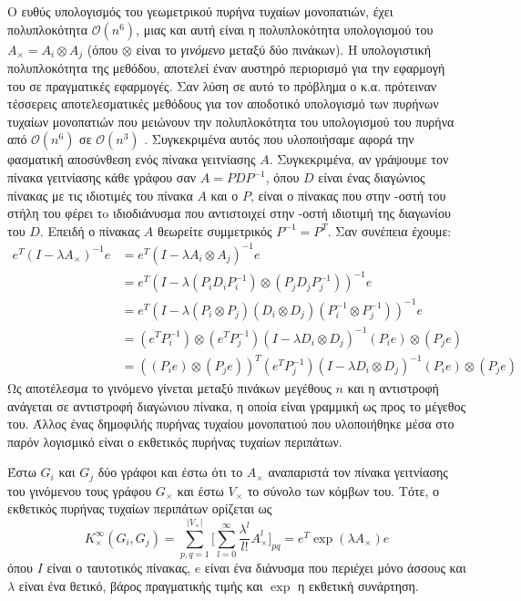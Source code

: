 Ο ευθύς υπολογισμός του γεωμετρικού πυρήνα τυχαίων μονοπατιών, έχει πολυπλοκότητα $\mathcal{O}(n^6)$, μιας και αυτή είναι η πολυπλοκότητα υπολογισμού του $A_{\times}=A_{i}\otimes A_{j}$ (όπου $\otimes$ είναι το \textit{γινόμενο } μεταξύ δύο πινάκων).
Η υπολογιστική πολυπλοκότητα της μεθόδου, αποτελεί έναν αυστηρό περιορισμό για την εφαρμογή του σε πραγματικές εφαρμογές.
Σαν λύση σε αυτό το πρόβλημα ο  κ.α. πρότειναν τέσσερεις αποτελεσματικές μεθόδους για τον αποδοτικό υπολογισμό των πυρήνων τυχαίων μονοπατιών  που μειώνουν την πολυπλοκότητα του υπολογισμού του πυρήνα από $\mathcal{O}(n^6)$ σε $\mathcal{O}(n^3)$ \cite{vishwanathan2010graph}.
Συγκεκριμένα αυτός που υλοποιήσαμε αφορά την φασματική αποσύνθεση ενός πίνακα γειτνίασης $A$.
Συγκεκριμένα, αν γράψουμε τον πίνακα γειτνίασης κάθε γράφου σαν $A=P D P^{-1}$, όπου $D$ είναι ένας διαγώνιος πίνακας με τις ιδιοτιμές του πίνακα $Α$ και ο $P$, είναι ο πίνακας που στην -οστή του στήλη του φέρει τo ιδιοδιάνυσμα που αντιστοιχεί στην -οστή ιδιοτιμή της διαγωνίου του $D$.
Επειδή ο πίνακας $A$ θεωρείτε συμμετρικός $P^{-1}=P^{T}$.
Σαν συνέπεια έχουμε:
\begin{equation}
\begin{aligned}
    e^T(I - \lambda A_{\times})^{-1} e & = e^T(I - \lambda A_{i}\otimes A_{j})^{-1} e \\ & = e^T(I - \lambda (P_{i} D_{i} P^{-1}_{i})\otimes (P_{j} D_{j} P^{-1}_{j}))^{-1} e \\
    & = e^T(I - \lambda (P_{i} \otimes P_{j}) (D_{i} \otimes D_{j}) (P^{-1}_{i} \otimes P^{-1}_{j}))^{-1} e \\
    &= (e^T P_{i}^{-1})\otimes (e^T P_{j}^{-1})(I - \lambda D_{i} \otimes D_{j})^{-1} (P_{i} e) \otimes (P_{j} e) \\
    &= ((P_{i} e) \otimes (P_{j} e))^{T} (e^T P_{j}^{-1})(I - \lambda D_{i} \otimes D_{j})^{-1} (P_{i} e) \otimes (P_{j} e)
\end{aligned}
\end{equation}
Ως αποτέλεσμα το γινόμενο  γίνεται μεταξύ πινάκων μεγέθους $n$ και η αντιστροφή ανάγεται σε αντιστροφή διαγώνιου πίνακα, η οποία είναι γραμμική ως προς το μέγεθος του.
Άλλος ένας δημοφιλής πυρήνας τυχαίου μονοπατιού που υλοποιήθηκε μέσα στο παρόν λογισμικό είναι ο εκθετικός πυρήνας τυχαίων περιπάτων.
\begin{definition}
	Έστω $G_i$ και $G_j$ δύο γράφοι και έστω ότι το $A_\times$ αναπαριστά τον πίνακα γειτνίασης του γινόμενου τους γράφου $G_\times$ και έστω $V_\times$ το σύνολο των κόμβων του.
	Τότε, ο εκθετικός πυρήνας τυχαίων περιπάτων ορίζεται ως
	\begin{equation}
    	K_{\times}^{\infty}(G_i,G_j) = \sum_{p,q=1}^{|V_{\times}|} \Big[ \sum_{l=0}^{\infty} \frac{\lambda^l}{l!} A_{\times}^l \Big]_{pq} = e^T \exp(\lambda A_{\times}) e
    \end{equation}
	όπου $I$ είναι ο ταυτοτικός πίνακας, $e$ είναι ένα διάνυσμα που περιέχει μόνο άσσους και $\lambda$ είναι ένα θετικό, βάρος πραγματικής τιμής και $\exp$ η εκθετική συνάρτηση.
\end{definition}
